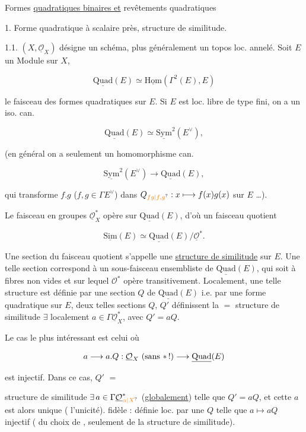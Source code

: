 Formes \uline{quadratiques binaires et} revêtements quadratiques

1. Forme quadratique à scalaire près, structure de similitude.

1.1. $(X,\underline{\mathcal O}_X)$ désigne un schéma, plus généralement un topos loc. annelé. Soit $E$ un Module sur $X$,

\[\underline{\mathrm{Quad}}(E)\simeq\underline{\mathrm{Hom}}(\Gamma^2(E),E)\]

le faisceau des formes quadratiques sur $E$. Si $E$ est loc. libre de type fini, on a un iso. can.

\[\underline{\mathrm{Quad}}(E)\simeq\underline{\mathrm{Sym}}^2(E^\vee),\]

(en général on a seulement un homomorphisme can.

\[\underline{\mathrm{Sym}}^2(E^\vee)\longrightarrow\underline{\mathrm{Quad}}(E),\]

qui transforme $f.g$ ($f,g\in\Gamma E^\vee$) dans $Q_{\unsure{fg|f,g}}:x\longmapsto f(x)g(x)$ sur $E$ \ldots).

Le faisceau  en groupes $\underline{\mathcal O}_X^\ast$ opère sur $\underline{\mathrm{Quad}}(E)$, d'où un faisceau quotient

\[\underline{\mathrm{Sim}}(E)\simeq\underline{\mathrm{Quad}}(E)/\underline{\mathcal O}^{\ast}.\]

Une section du faisceau quotient s'appelle une \uline{structure de similitude} sur $E$. Une telle section correspond à un sous-faisceau ensembliste de $\underline{\mathrm{Quad}}(E)$, qui  soit à fibres non vides et sur lequel $\mathcal O^\ast$ opère transitivement. Localement, une telle structure est définie par une section $Q$ de $\underline{\mathrm{Quad}}(E)$ i.e. par une forme quadratique sur $E$,  deux telles sections $Q$, $Q'$ définissent la $=$ structure de similitude  $\exists$ localement $a\in\Gamma\underline{\mathcal O}_X^\ast$, avec $Q'=aQ$.

Le cas le plus intéressant est celui où 

\[a\longrightarrow a.Q:\underline{\mathcal O}_X\ (\text{sans $\ast$\,!})\longrightarrow\underline{\mathrm{Quad}}(E)\]

est injectif. Dans ce cas,  $Q'$   $=$

structure de similitude  $\exists\,a\in\Gamma\underline{\mathcal O}_{\unsure{\alpha|X}}^\ast$ (\uline{globalement}) telle que $Q'=aQ$, et cette $a$ est alors unique ( l'unicité).   fidèle : définie loc. par une $Q$ telle que $a\longmapsto aQ$ injectif ( du choix de , seulement de la structure de similitude).

